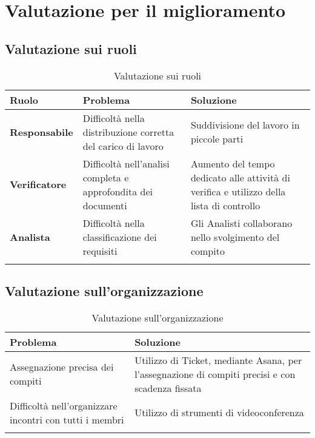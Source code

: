 \section{Valutazione per il miglioramento}
\label{valutazioneMiglioramento}
	\subsection{Valutazione sui ruoli}
	\begin{center}	
	
   			\begin{longtable}{ | >{\centering\arraybackslash}m{2.5cm} | >{\raggedright\arraybackslash}p{5cm} | >{\raggedright\arraybackslash}p{5.5cm} | }
        
        	\hline
        		\textbf{Ruolo} & \textbf{Problema} & \textbf{Soluzione} \\ \hline
        	\endhead
				\textbf{Responsabile} & 
									Difficoltà nella distribuzione corretta del carico di lavoro
								
							 & 
							 		Suddivisione del lavoro in piccole parti
							   
							 \\ \hline
				\textbf{Verificatore} & 
									 Difficoltà nell'analisi completa e approfondita dei documenti
								
							 & 
							 		Aumento del tempo dedicato alle attività di verifica e utilizzo della lista
							 		di controllo
							   
							 \\ \hline
				\textbf{Analista} & 
								Difficoltà nella classificazione dei requisiti
							
						 & 
							 	Gli Analisti collaborano nello svolgimento del compito
							
							 \\ \hline
			\caption[Valutazione sui ruoli]{Valutazione sui ruoli}
			\end{longtable}
	
			\end{center}
	\subsection{Valutazione sull'organizzazione}
	\begin{center}	
	
   			\begin{longtable}{ | >{\raggedright\arraybackslash}m{5.5cm} | >{\raggedright\arraybackslash}m{8cm} | }
        
        	\hline
        		\textbf{Problema} & \textbf{Soluzione} \\ \hline
        	\endhead
			Assegnazione precisa dei compiti & Utilizzo di Ticket, mediante Asana, per l'assegnazione di compiti precisi
			e con scadenza fissata \\ \hline
			Difficoltà nell'organizzare incontri con tutti i membri & Utilizzo di strumenti di videoconferenza \\ \hline
			\caption[Valutazione sull'organizzazione]{Valutazione sull'organizzazione}
			\end{longtable}
	
			\end{center}

